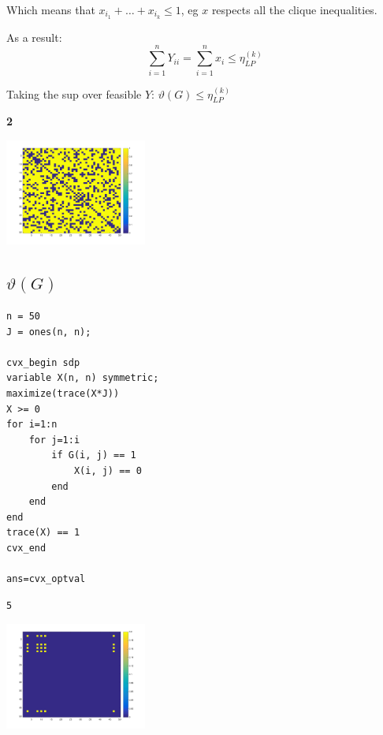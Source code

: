 \documentclass[11pt]{article}
\begin{document}
Which means that \(x_{i_1} + \ldots + x_{i_k} \le 1\), eg \(x\) respects all the clique inequalities.


As a result:
$$\sum_{i=1}^n Y_{ii} = \sum_{i=1}^n x_i \le \eta^{(k)}_{LP}$$

Taking the sup over feasible \(Y\):
\(\vartheta(G) \le \eta_{LP}^{(k)}\)



\textbf{2}
\begin{org}
\begin{center}
\includegraphics[width=0.35\textwidth]{graph.png}
\end{center}
\end{org}




\subsection{\(\vartheta(G)\)}
\label{sec:orgheadline2}
\begin{verbatim}
n = 50
J = ones(n, n);

cvx_begin sdp
variable X(n, n) symmetric;
maximize(trace(X*J))
X >= 0
for i=1:n
    for j=1:i
        if G(i, j) == 1
            X(i, j) == 0
        end
    end
end
trace(X) == 1
cvx_end

ans=cvx_optval
\end{verbatim}

\begin{verbatim}
5
\end{verbatim}


\begin{org}
\begin{center}
\includegraphics[width=0.35\textwidth]{X.png}
\end{center}
\end{org}
\end{document}
